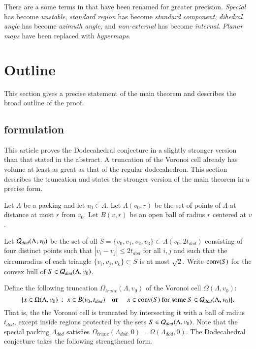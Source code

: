 There are a some terms in \cite{arx} that have been renamed for
greater precision.
{\it Special} has become {\it unstable}, {\it standard region}
has become {\it standard component},
{\it dihedral angle} has 
become {\it azimuth angle}, and {\it non-external} has
become {\it internal}.  {\it Planar maps} have been replaced with {\it hypermaps}.


\section{Outline}

This section gives a precise statement of the main theorem
and describes the broad outline of the proof.


\subsection{formulation}\label{sec:form}

This article proves the Dodecahedral conjecture in a slightly
stronger version than that stated in the abstract. 
A  truncation of the Voronoi cell already has volume
at least as great as that of the regular dodecahedron.  This
section describes the truncation and states the stronger version
of the main theorem in a precise form.

Let $\Lambda$ be a packing and let $v_0\in\Lambda$.
Let $\Lambda(v_0,r)$ be the set of points of $\Lambda$ at distance at most $r$ from $v_0$.
Let $B(v,r)$ be an open ball
of radius $r$ centered at $v$.  

Let ${\mathcal Q}_{dod}(\Lambda,v_0)$ 
be the set of all $S=\{v_0,v_1,v_2,v_3\}\subset\Lambda(v_0,2t_{dod})$
consisting of four distinct points such that $|v_i-v_j|\le 2t_{dod}$ for all $i,j$
and such that the circumradius of each triangle $\{v_i,v_j,v_k\}\subset S$ is at most
$\sqrt2$.   Write ${\operatorname{conv}}(S)$ for the convex hull of $S\in{\mathcal Q}_{dod}(\Lambda,v_0)$. 


Define the following truncation $\Omega_{trunc}(\Lambda,v_0)$ 
of the Voronoi cell $\Omega(\Lambda,v_0)$:
   $$
   \{x \in \Omega(\Lambda,v_0) \ :\    x\in B(v_0,t_{dod}) \quad\text{\bf  or }\quad x \in {\operatorname{conv}}(S)
     \text{ for some } S\in {\mathcal Q}_{dod}(\Lambda,v_0) \}. 
   $$
That is, the the Voronoi cell is truncated by intersecting it with a ball of radius $t_{dod}$,
except inside regions protected by the sets $S\in{\mathcal Q}_{dod}(\Lambda,v_0)$.
Note that the special packing $\Lambda_{dod}$ satisfies
$\Omega_{trunc}(\Lambda_{dod},0) = \Omega(\Lambda_{dod},0)$.
The  Dodecahedral conjecture takes the following strengthened form.


